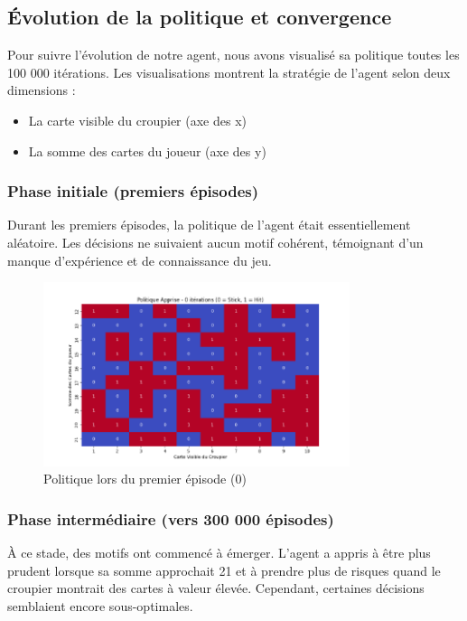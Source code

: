 \documentclass{article}
\begin{document}
\subsection{Évolution de la politique et convergence}

\quad Pour suivre l'évolution de notre agent, nous avons visualisé sa politique toutes les 100 000 itérations. Les visualisations montrent la stratégie de l'agent selon deux dimensions : 
\begin{itemize} 
    \item  La carte visible du croupier (axe des x)
    \item La somme des cartes du joueur (axe des y)
\end{itemize}

    \subsubsection{Phase initiale (premiers épisodes)}
    
    \quad Durant les premiers épisodes, la politique de l'agent était essentiellement aléatoire. Les décisions ne suivaient aucun motif cohérent, témoignant d'un manque d'expérience et de connaissance du jeu.\\
    
    \begin{figure}[ht]
        \centering
        \includegraphics[width=0.8\textwidth]{1.png}
        \caption{Politique lors du premier épisode (0)}
    \end{figure}

    \subsubsection{Phase intermédiaire (vers 300 000 épisodes)}
    
    \quad À ce stade, des motifs ont commencé à émerger. L'agent a appris à être plus prudent lorsque sa somme approchait 21 et à prendre plus de risques quand le croupier montrait des cartes à valeur élevée. Cependant, certaines décisions semblaient encore sous-optimales.\\
\end{document}
